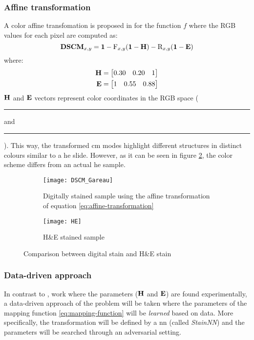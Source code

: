 \documentclass[../main.tex]{subfiles}
\begin{document}
\subsubsection{Affine transformation} \label{sec:affine-transformation}
A color affine transfomation is proposed in \parencite{Gareau2009} for the
function $f$
where the RGB values for each pixel are computed as:
\begin{equation} \label{eq:affine-transformation}
	\mathbf{DSCM}_{x,y} = \mathbf{1}
	- \text{F}_{x,y} (\mathbf{1} - \mathbf{H}) - \text{R}_{x,y} (\mathbf{1} - \mathbf{E})
\end{equation}
where:
\begin{align*}
\mathbf{H} &= \begin{bmatrix} 0.30 & 0.20 & 1 \end{bmatrix} \\
\mathbf{E} &= \begin{bmatrix} 1 & 0.55 & 0.88 \end{bmatrix}
\end{align*}
$\mathbf{H}$ and $\mathbf{E}$ vectors represent color coordinates in the RGB
space (
\textcolor{Hcolor}{\rule{0.7\baselineskip}{0.7\baselineskip}} and
\textcolor{Ecolor}{\rule{0.7\baselineskip}{0.7\baselineskip}}).
This way, the transformed \gls{cm} modes highlight different structures in
distinct
colours similar to a \gls{he} slide. However, as it can be seen in figure
\ref{fig:affine-example},
the color scheme differs from an actual \gls{he} sample.

\begin{figure}[h]
\centering
\begin{subfigure}{.5\textwidth}
  \centering
  \texttt{[image: DSCM\_Gareau]}
  \caption{Digitally stained sample using the affine transformation of equation
  \eqref{eq:affine-transformation}}
\end{subfigure}%
\begin{subfigure}{.5\textwidth}
  \centering
  \texttt{[image: HE]}
  \caption{H\&E stained sample}
  \label{fig:HE-example}
\end{subfigure}
\caption{Comparison between digital stain and H\&E stain}
\label{fig:affine-example}
\end{figure}

\subsubsection{Data-driven approach}
In contrast to \parencite{Gareau2009}, work where the parameters
($\mathbf{H}$ and $\mathbf{E}$) are found experimentally, a data-driven approach
of the problem will be taken where the parameters of the mapping function
\eqref{eq:mapping-function} will be \emph{learned} based on data.
More specifically, the transformation will be defined by a \gls{nn} (called \emph{StainNN})
and the parameters will be searched through an adversarial setting.
\end{document}
